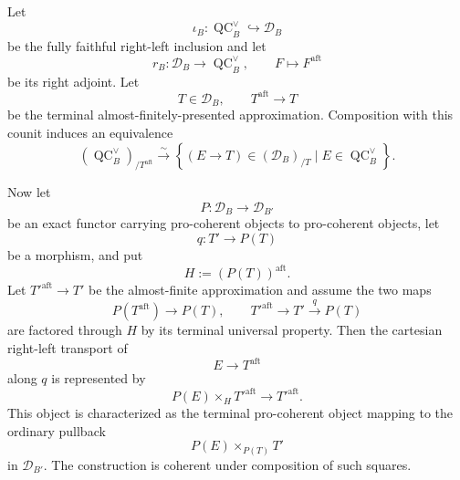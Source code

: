 \begin{lemma}
\label{lem:bnla-anchored-right-left-pullback}
Let
\[
    \iota_B:
    \operatorname{QC}^{\vee}_B
    \hookrightarrow
    \mathcal D_B
\]
be the fully faithful right-left inclusion and let
\[
    r_B:\mathcal D_B\longrightarrow\operatorname{QC}^{\vee}_B,
    \qquad
    F\longmapsto F^{\mathrm{aft}}
\]
be its right adjoint.  Let
\[
    T\in\mathcal D_B,
    \qquad
    T^{\mathrm{aft}}\longrightarrow T
\]
be the terminal almost-finitely-presented approximation.  Composition with
this counit induces an equivalence
\[
\boxed{
    \left(\operatorname{QC}^{\vee}_B\right)_{/T^{\mathrm{aft}}}
    \xrightarrow{\sim}
    \left\{
        (E\to T)\in(\mathcal D_B)_{/T}
        \mid E\in\operatorname{QC}^{\vee}_B
    \right\}.}
\]

Now let
\[
    P:\mathcal D_B\longrightarrow\mathcal D_{B'}
\]
be an exact functor carrying pro-coherent objects to pro-coherent objects, let
\[
    q:T'\longrightarrow P(T)
\]
be a morphism, and put
\[
    H:=(P(T))^{\mathrm{aft}}.
\]
Let $T'^{\mathrm{aft}}\to T'$ be the almost-finite approximation and assume
the two maps
\[
    P(T^{\mathrm{aft}})\longrightarrow P(T),
    \qquad
    T'^{\mathrm{aft}}\longrightarrow T'\xrightarrow{q}P(T)
\]
are factored through $H$ by its terminal universal property.  Then the
cartesian right-left transport of
\[
    E\longrightarrow T^{\mathrm{aft}}
\]
along $q$ is represented by
\[
\boxed{
    P(E)\times_H T'^{\mathrm{aft}}
    \longrightarrow
    T'^{\mathrm{aft}}.}
\]
This object is characterized as the terminal pro-coherent object mapping to
the ordinary pullback
\[
    P(E)\times_{P(T)}T'
\]
in $\mathcal D_{B'}$.  The construction is coherent under composition of such
squares.
\end{lemma}

